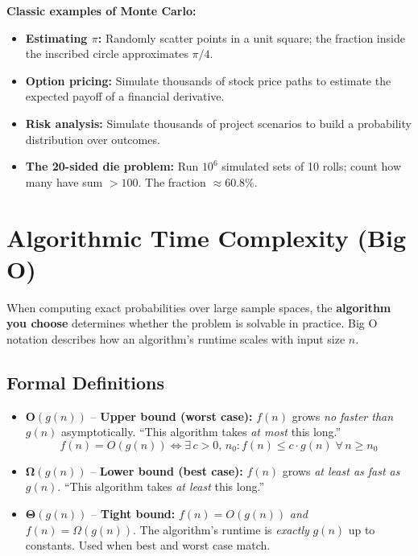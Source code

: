 \documentclass[11pt, letterpaper]{article}
\begin{document}
\begin{tcolorbox}[colback=part4bg, colframe=sectionorange, arc=3pt, boxrule=1pt]
\textbf{Classic examples of Monte Carlo:}
\begin{itemize}[noitemsep, leftmargin=*]
  \item \textbf{Estimating $\pi$:} Randomly scatter points in a unit square; the fraction inside the inscribed circle approximates $\pi/4$.
  \item \textbf{Option pricing:} Simulate thousands of stock price paths to estimate the expected payoff of a financial derivative.
  \item \textbf{Risk analysis:} Simulate thousands of project scenarios to build a probability distribution over outcomes.
  \item \textbf{The 20-sided die problem:} Run $10^6$ simulated sets of 10 rolls; count how many have sum $> 100$. The fraction $\approx 60.8\%$.
\end{itemize}
\end{tcolorbox}

\section*{Algorithmic Time Complexity (Big O)}

When computing exact probabilities over large sample spaces, the \textbf{algorithm you choose} determines whether the problem is solvable in practice. Big O notation describes how an algorithm's runtime scales with input size $n$.

\subsection*{Formal Definitions}

\begin{tcolorbox}[colback=part4bg, colframe=sectionorange,
  title={\bfseries Big O, Big Omega, Big Theta}, arc=3pt, boxrule=1pt]
\begin{itemize}[noitemsep, leftmargin=*]
  \item $\mathbf{O}(g(n))$ -- \textbf{Upper bound (worst case):} $f(n)$ grows \emph{no faster than} $g(n)$ asymptotically. ``This algorithm takes \emph{at most} this long.''
  \[
    f(n) = O(g(n)) \iff \exists\, c > 0,\, n_0 : f(n) \leq c \cdot g(n)\; \forall\, n \geq n_0
  \]
  \item $\mathbf{\Omega}(g(n))$ -- \textbf{Lower bound (best case):} $f(n)$ grows \emph{at least as fast as} $g(n)$. ``This algorithm takes \emph{at least} this long.''
  \item $\mathbf{\Theta}(g(n))$ -- \textbf{Tight bound:} $f(n) = O(g(n))$ \emph{and} $f(n) = \Omega(g(n))$. The algorithm's runtime is \emph{exactly} $g(n)$ up to constants. Used when best and worst case match.
\end{itemize}
\end{tcolorbox}
\end{document}
